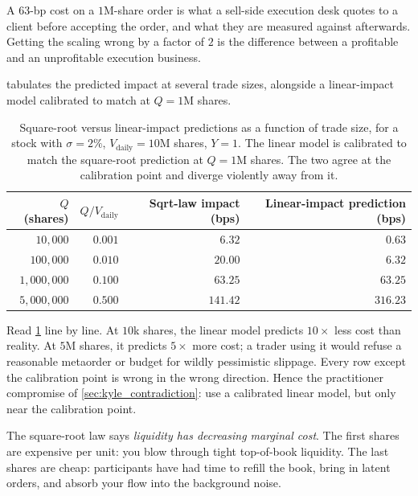A $63$-bp cost on a $1$M-share order is what a sell-side execution
desk quotes to a client before accepting the order, and what they
are measured against afterwards. Getting the scaling wrong by a
factor of $2$ is the difference between a profitable and an
unprofitable execution business.

 tabulates the predicted impact at several
trade sizes, alongside a linear-impact model calibrated to match at
$Q = 1$M shares.

\begin{table}[htbp]
\centering
\begin{tabular}{rrrr}
\toprule
$Q$ (shares) & $Q / V_{\text{daily}}$
             & Sqrt-law impact (bps)
             & Linear-impact prediction (bps) \\
\midrule
$10{,}000$   & $0.001$ & $6.32$  & $0.63$  \\
$100{,}000$  & $0.010$ & $20.00$ & $6.32$  \\
$1{,}000{,}000$ & $0.100$ & $63.25$ & $63.25$ \\
$5{,}000{,}000$ & $0.500$ & $141.42$ & $316.23$ \\
\bottomrule
\end{tabular}
\caption{Square-root versus linear-impact predictions as a function of
trade size, for a stock with $\sigma = 2\%$, $V_{\text{daily}} = 10$M
shares, $Y = 1$. The linear model is calibrated to match the
square-root prediction at $Q = 1$M shares. The two agree at the
calibration point and diverge violently away from it.}
\label{tab:sqrt_scaling}
\end{table}

Read \cref{tab:sqrt_scaling} line by line. At $10$k shares, the
linear model predicts $10\times$ less cost than reality. At $5$M
shares, it predicts $5\times$ more cost; a trader using it would
refuse a reasonable metaorder or budget for wildly pessimistic
slippage. Every row except the calibration point is wrong in the
wrong direction. Hence the practitioner compromise of
\cref{sec:kyle_contradiction}: use a calibrated linear model, but
only near the calibration point.

\begin{intuitionbox}
The square-root law says \emph{liquidity has decreasing marginal
cost}. The first shares are expensive per unit: you blow through
tight top-of-book liquidity. The last shares are cheap: participants
have had time to refill the book, bring in latent orders, and absorb
your flow into the background noise.
\end{intuitionbox}

